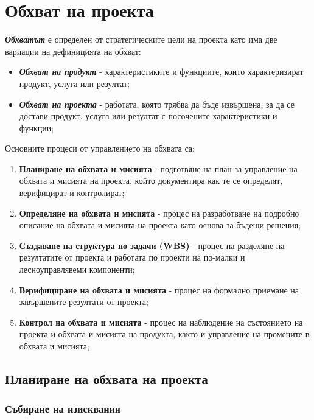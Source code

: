 \documentclass[fleqn,12pt]{article}
\begin{document}
\section{Обхват на проекта}

\textit{\textbf{Обхватът}} е определен от стратегическите цели на проекта като има две вариации на дефиницията на обхват:
\begin{itemize}
    \item \textit{\textbf{Обхват на продукт}} - характеристиките и функциите, които характеризират продукт, услуга или резултат;
    \item \textit{\textbf{Обхват на проекта}} - работата, която трябва да бъде извършена, за да се достави продукт, услуга или резултат с посочените характеристики и функции;
\end{itemize}

\bigbreak

Основните процеси от управлението на обхвата са:
\begin{enumerate}
    \item \textbf{Планиране на обхвата и мисията} - подготвяне на план за управление на обхвата и мисията на проекта, който документира как те се определят, верифицират и контролират;  %
    \item \textbf{Определяне на обхвата и мисията} - процес на разработване на подробно описание на обхвата и мисията на проекта като основа за бъдещи решения;
    \item \textbf{Създаване на структура по задачи (WBS)} - процес на разделяне на резултатите от проекта и работата по проекти на по-малки и лесноуправлявеми компоненти;
    \item \textbf{Верифициране на обхвата и мисията} - процес на формално приемане на завършените резултати от проекта;
    \item \textbf{Контрол на обхвата и мисията} - процес на наблюдение на състоянието на проекта и обхвата и мисията на продукта, както и управление на промените в обхвата и мисията;
\end{enumerate}

\subsection{Планиране на обхвата на проекта}
\subsubsection{Събиране на изисквания}
\end{document}
